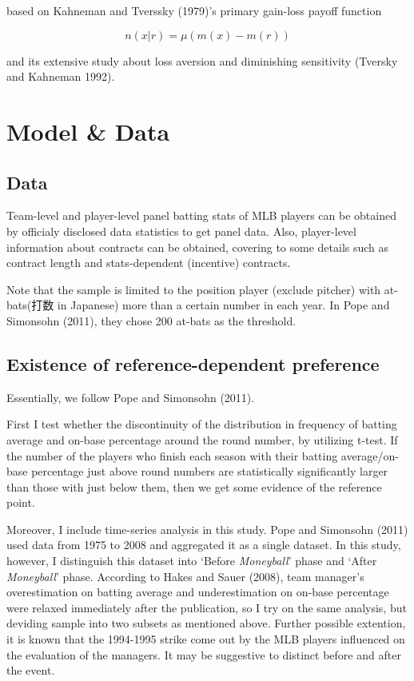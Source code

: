 \documentclass{jsarticle}[12pt]
\begin{document}
based on Kahneman and Tverssky (1979)'s primary gain-loss payoff function

\[n(x|r) = \mu ( m(x) - m(r) ) \]

and its extensive study about loss aversion and diminishing sensitivity (Tversky and Kahneman 1992).

\section{Model \& Data}
 \subsection{Data}
 
 Team-level and player-level panel batting stats of MLB players can be obtained by officialy disclosed data statistics to get panel data. Also, player-level information about contracts can be obtained, covering to some details such as contract length and stats-dependent (incentive) contracts.
 
 Note that the sample is limited to the position player (exclude pitcher) with at-bats(打数 in Japanese) more than a certain number in each year. In Pope and Simonsohn (2011), they chose 200 at-bats as the threshold.
 
 \subsection{Existence of reference-dependent preference}
 
 Essentially, we follow Pope and Simonsohn (2011).
 
 First I test whether the discontinuity of the distribution in frequency of batting average and on-base percentage around the round number, by utilizing t-test. If the number of the players who finish each season with their batting average/on-base percentage just above round numbers are statistically significantly larger than those with just below them, then we get some evidence of the reference point.
 
 Moreover, I include time-series analysis in this study. Pope and Simonsohn (2011) used data from 1975 to 2008 and aggregated it as a single dataset. In this study, however, I distinguish this dataset into `Before \textit{Moneyball}' phase and `After \textit{Moneyball}' phase. According to Hakes and Sauer (2008), team manager's overestimation on batting average and underestimation on on-base percentage were relaxed immediately after the publication, so I try on the same analysis, but deviding sample into two subsets as mentioned above. Further possible extention, it is known that the 1994-1995 strike come out by the MLB players influenced on the evaluation of the managers. It may be suggestive to distinct before  and after the event.
 
\end{document}
